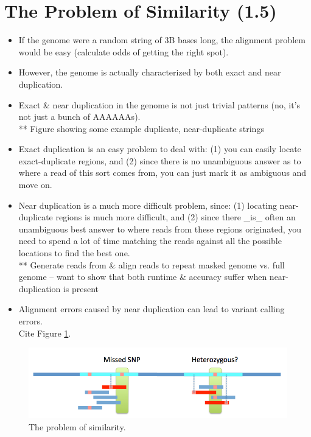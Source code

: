 \documentclass[10pt, conference, compsocconf]{IEEEtran}
\begin{document}
\section{The Problem of Similarity (1.5)}
\begin{itemize}
\item{If the genome were a random string of 3B bases long, the alignment problem would be easy (calculate odds of getting the right spot).}
\item{However, the genome is actually characterized by both exact and near duplication.}
\item{Exact \& near duplication in the genome is not just trivial patterns (no, it's not just a bunch of AAAAAAs).}\\
** Figure showing some example duplicate, near-duplicate strings
\item{Exact duplication is an easy problem to deal with:  (1) you can easily locate exact-duplicate regions, and (2) since there is no unambiguous answer as to where a read of this sort comes from, you can just mark it as ambiguous and move on.}
\item{Near duplication is a much more difficult problem, since:  (1) locating near-duplicate regions is much more difficult, and (2) since there \_is\_ often an unambiguous best answer to where reads from these regions originated, you need to spend a lot of time matching the reads against all the possible locations to find the best one.}\\
** Generate reads from \& align reads to repeat masked genome vs. full genome -- want to show that both runtime \& accuracy suffer when near-duplication is present
\item{Alignment errors caused by near duplication can lead to variant calling errors.}\\
Cite Figure \ref{fig:problemOfSimilarity}.
\end{itemize}
\begin{figure}
\centering
\includegraphics[scale=0.5]{problemOfSimilarity}
\caption{The problem of similarity.}
\label{fig:problemOfSimilarity}
\end{figure}
\end{document}
